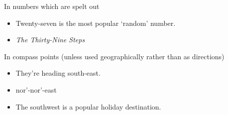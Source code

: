 \documentclass[11pt,a4paper]{book}
\newcommand{\cmark}{{\color{green(html/cssgreen)}\checkmark}}%
\begin{document}
		In numbers which are spelt out
		{\firasans \begin{mdframed}[backgroundcolor=aliceblue] \begin{itemize}[label=\cmark]
			\item Twenty-seven is the most popular `random' number.
			\item \textit{The Thirty-Nine Steps}
		\end{itemize} \end{mdframed} }
		In compass points (unless used geographically rather than as directions)
		{\firasans \begin{mdframed}[backgroundcolor=aliceblue] \begin{itemize}[label=\cmark]
			\item They're heading south-east.
			\item nor'-nor'-east
			\item The southwest is a popular holiday destination.
		\end{itemize} \end{mdframed} }
\end{document}

